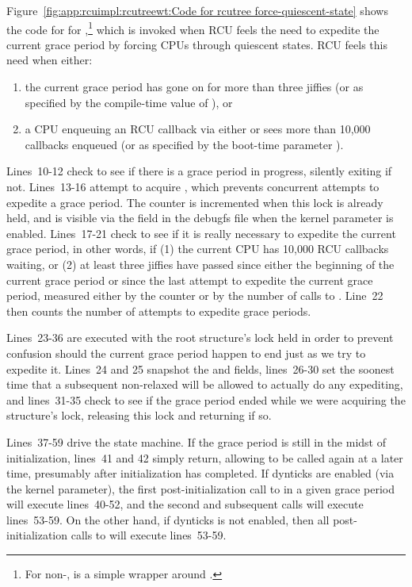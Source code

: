 Figure~\ref{fig:app:rcuimpl:rcutreewt:Code for rcutree force-quiescent-state}
shows the code for  for
,\footnote{
	For non-,  is a
	simple wrapper around .}
which is invoked when RCU feels the need to expedite the current
grace period by forcing CPUs through quiescent states.
RCU feels this need when either:
\begin{enumerate}
\item	the current grace period has gone on for more than three jiffies
	(or as specified by the compile-time value of
	), or
\item	a CPU enqueuing an RCU callback via either 
	or  sees more than 10,000 callbacks enqueued
	(or as specified by the boot-time parameter ).
\end{enumerate}

Lines~10-12 check to see if there is a grace period in progress,
silently exiting if not.
Lines~13-16 attempt to acquire , which prevents concurrent
attempts to expedite a grace period.
The  counter is incremented when this lock is
already held, and is visible via the  field
in the  debugfs file when the  kernel
parameter is enabled.
Lines~17-21 check to see if it is really necessary to expedite the
current grace period, in other words, if (1) the current CPU has 10,000
RCU callbacks waiting, or (2) at least three jiffies have passed
since either the beginning of the current grace period or since the
last attempt to expedite the current grace period, measured either
by the  counter or by the number of calls to
.
Line~22 then counts the number of attempts to expedite grace periods.

Lines~23-36 are executed with the root  structure's lock
held in order to prevent confusion should the current grace period
happen to end just as we try to expedite it.
Lines~24 and 25 snapshot the  and  fields,
lines~26-30 set the soonest time that a subsequent non-relaxed
 will be allowed to actually do
any expediting, and lines~31-35 check to see if the grace period
ended while we were acquiring the  structure's lock,
releasing this lock and returning if so.

Lines~37-59 drive the  state machine.
If the grace period is still in the midst of initialization,
lines~41 and 42 simply return, allowing 
to be called again at a later time, presumably after initialization
has completed.
If dynticks are enabled (via the  kernel
parameter), the first post-initialization call
to  in a given grace period will
execute lines~40-52, and the second and subsequent calls will
execute lines~53-59.
On the other hand, if dynticks is not enabled, then all post-initialization
calls to  will execute lines~53-59.

